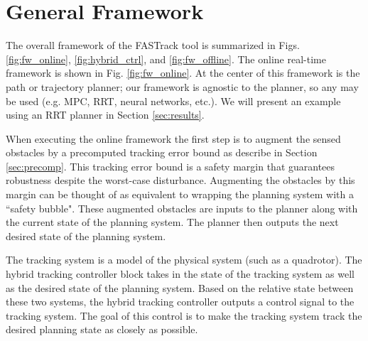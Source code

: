 \section{General Framework \label{sec:framework}}
The overall framework of the FASTrack tool is summarized in Figs. \ref{fig:fw_online}, \ref{fig:hybrid_ctrl}, and \ref{fig:fw_offline}. The online real-time framework is shown in Fig. \ref{fig:fw_online}. At the center of this framework is the path or trajectory planner; our framework is agnostic to the planner, so any may be used (e.g. MPC, RRT, neural networks, etc.). We will present an example using an RRT planner in Section \ref{sec:results}.

When executing the online framework the first step is to augment the sensed obstacles by a precomputed tracking error bound as describe in Section \ref{sec:precomp}. This tracking error bound is a safety margin that guarantees robustness despite the worst-case disturbance. Augmenting the obstacles by this margin can be thought of as equivalent to wrapping the planning system with a ``safety bubble". These augmented obstacles are inputs to the planner along with the current state of the planning system. The planner then outputs the next desired state of the planning system. 

The tracking system is a model of the physical system (such as a quadrotor). The hybrid tracking controller block takes in the state of the tracking system as well as the desired state of the planning system. Based on the relative state between these two systems, the hybrid tracking controller outputs a control signal to the tracking system. The goal of this control is to make the tracking system track the desired planning state as closely as possible.



